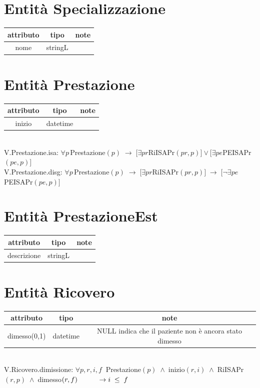 \documentclass[a4paper,12pt]{report}
\begin{document}
      \section*{Entità Specializzazione}
        \begin{tabular}{|c|c|c|}
	        \hline attributo & tipo & note \\
	        \hline nome & stringL & \\
	        \hline
        \end{tabular}

      \section*{Entità Prestazione}
        \begin{tabular}{|c|c|c|}
	        \hline attributo & tipo & note \\
	        \hline inizio & datetime & \\
	        \hline
        \end{tabular} \\
        V.Prestazione.isa: $\forall p \, $Prestazione$(p) \;\rightarrow\; [\exists pr $RiISAPr$(pr, p)] \vee [\exists pe $PEISAPr$(pe, p)]$ \\
        V.Prestazione.disg: $\forall p \, $Prestazione$(p) \;\rightarrow\; [\exists pr $RiISAPr$(pr, p)] \;\rightarrow\; [\neg\exists pe $PEISAPr$(pe, p)]$

      \section*{Entità PrestazioneEst}
        \begin{tabular}{|c|c|c|}
	        \hline attributo & tipo & note \\
	        \hline descrizione & stringL & \\
	        \hline
        \end{tabular}

      \section*{Entità Ricovero}
        \begin{tabular}{|c|c|c|}
	        \hline attributo & tipo & note \\
	        \hline dimesso(0,1) & datetime & NULL indica che il paziente non è ancora stato dimesso \\
	        \hline
        \end{tabular} \\
        V.Ricovero.dimissione: $\forall p,r,i,f\;\;$Prestazione$(p) \;\wedge\; $inizio$(r, i) \;\wedge\; $RiISAPr$(r, p) \;\wedge\; $dimesso$(r, f) \\
        \hspace*{1cm}\rightarrow i \;\leq\; f$
\end{document}
